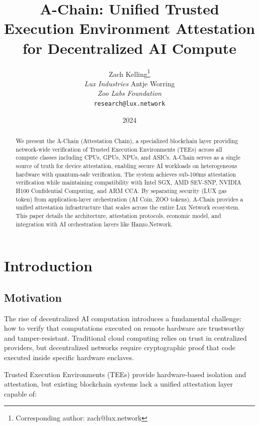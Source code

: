 \documentclass[11pt,a4paper]{article}
\title{A-Chain: Unified Trusted Execution Environment Attestation for Decentralized AI Compute}
\author{
Zach Kelling\thanks{Corresponding author: zach@lux.network}\\
\textit{Lux Industries}
\quad
Antje Worring\\
\textit{Zoo Labs Foundation}\\
\texttt{research@lux.network}
}
\date{2024}
\begin{document}
\luxcoverpage
\maketitle
\begin{abstract}
We present the A-Chain (Attestation Chain), a specialized blockchain layer providing network-wide verification of Trusted Execution Environments (TEEs) across all compute classes including CPUs, GPUs, NPUs, and ASICs. A-Chain serves as a single source of truth for device attestation, enabling secure AI workloads on heterogeneous hardware with quantum-safe verification. The system achieves sub-100ms attestation verification while maintaining compatibility with Intel SGX, AMD SEV-SNP, NVIDIA H100 Confidential Computing, and ARM CCA. By separating security (LUX gas token) from application-layer orchestration (AI Coin, ZOO tokens), A-Chain provides a unified attestation infrastructure that scales across the entire Lux Network ecosystem. This paper details the architecture, attestation protocols, economic model, and integration with AI orchestration layers like Hanzo.Network.
\end{abstract}


\luxcoverpage
\maketitle

\section{Introduction}

\subsection{Motivation}

The rise of decentralized AI computation introduces a fundamental challenge: how to verify that computations executed on remote hardware are trustworthy and tamper-resistant. Traditional cloud computing relies on trust in centralized providers, but decentralized networks require cryptographic proof that code executed inside specific hardware enclaves.

Trusted Execution Environments (TEEs) provide hardware-based isolation and attestation, but existing blockchain systems lack a unified attestation layer capable of:
\end{document}
